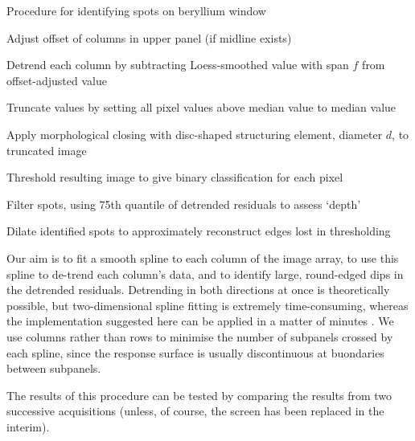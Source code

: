 \documentclass[\main/IO-Pixels.tex]{subfiles}
\begin{document}
\begin{algorithm}
    \caption{Procedure for identifying spots on beryllium window}
	\label{proc:screen-spots}



Adjust offset of columns in upper panel (if midline exists)

Detrend each column by subtracting Loess-smoothed value with span $f$ from offset-adjusted value

Truncate values by setting all pixel values above median value to median value

Apply morphological closing with disc-shaped structuring element, diameter $d$, to truncated image

Threshold resulting image to give binary classification for each pixel

Filter spots, using 75th quantile of detrended residuals to assess `depth'

Dilate identified spots to approximately reconstruct edges lost in thresholding

\end{algorithm}

Our aim is to fit a smooth spline to each column of the image array, to use this spline to de-trend each column's data, and to identify large, round-edged dips in the detrended residuals. Detrending in both directions at once is theoretically possible, but two-dimensional spline fitting is extremely time-consuming, whereas the implementation suggested here can be applied in a matter of minutes . We use columns rather than rows to minimise the number of subpanels crossed by each spline, since the response surface is usually discontinuous at buondaries between subpanels.


The results of this procedure can be tested by comparing the results from two successive acquisitions (unless, of course, the screen has been replaced in the interim). %
\end{document}

